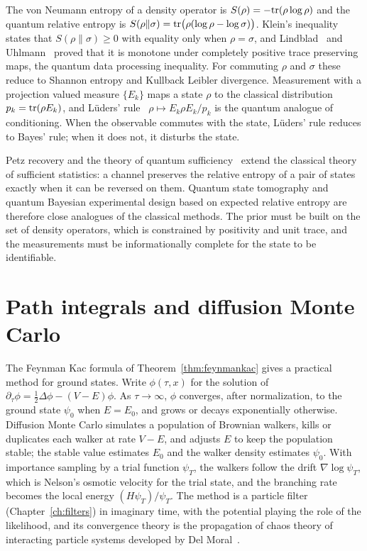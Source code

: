 The von Neumann entropy of a density operator is $S(\rho) = -\mathrm{tr}(\rho\log\rho)$ and the quantum relative entropy is $S(\rho\|\sigma) = \mathrm{tr}\big(\rho(\log\rho-\log\sigma)\big)$. Klein's inequality~\cite{klein1931} states that $S(\rho\|\sigma)\geq0$ with equality only when $\rho = \sigma$, and Lindblad~\cite{lindblad1975} and Uhlmann~\cite{uhlmann1977} proved that it is monotone under completely positive trace preserving maps, the quantum data processing inequality. For commuting $\rho$ and $\sigma$ these reduce to Shannon entropy and Kullback Leibler divergence. Measurement with a projection valued measure $\{E_k\}$ maps a state $\rho$ to the classical distribution $p_k = \mathrm{tr}(\rho E_k)$, and L\"uders' rule~\cite{luders1950} $\rho\mapsto E_k\rho E_k/p_k$ is the quantum analogue of conditioning. When the observable commutes with the state, L\"uders' rule reduces to Bayes' rule; when it does not, it disturbs the state.

Petz recovery and the theory of quantum sufficiency~\cite{petz1986,petz1988} extend the classical theory of sufficient statistics: a channel preserves the relative entropy of a pair of states exactly when it can be reversed on them. Quantum state tomography and quantum Bayesian experimental design based on expected relative entropy are therefore close analogues of the classical methods. The prior must be built on the set of density operators, which is constrained by positivity and unit trace, and the measurements must be informationally complete for the state to be identifiable.

\section{Path integrals and diffusion Monte Carlo}

The Feynman Kac formula of Theorem~\ref{thm:feynmankac} gives a practical method for ground states. Write $\phi(\tau,x)$ for the solution of $\partial_\tau\phi = \frac12\Delta\phi-(V-E)\phi$. As $\tau\to\infty$, $\phi$ converges, after normalization, to the ground state $\psi_0$ when $E = E_0$, and grows or decays exponentially otherwise. Diffusion Monte Carlo simulates a population of Brownian walkers, kills or duplicates each walker at rate $V-E$, and adjusts $E$ to keep the population stable; the stable value estimates $E_0$ and the walker density estimates $\psi_0$. With importance sampling by a trial function $\psi_T$, the walkers follow the drift $\nabla\log\psi_T$, which is Nelson's osmotic velocity for the trial state, and the branching rate becomes the local energy $(H\psi_T)/\psi_T$. The method is a particle filter (Chapter~\ref{ch:filters}) in imaginary time, with the potential playing the role of the likelihood, and its convergence theory is the propagation of chaos theory of interacting particle systems developed by Del Moral~\cite{delmoral2004}.

